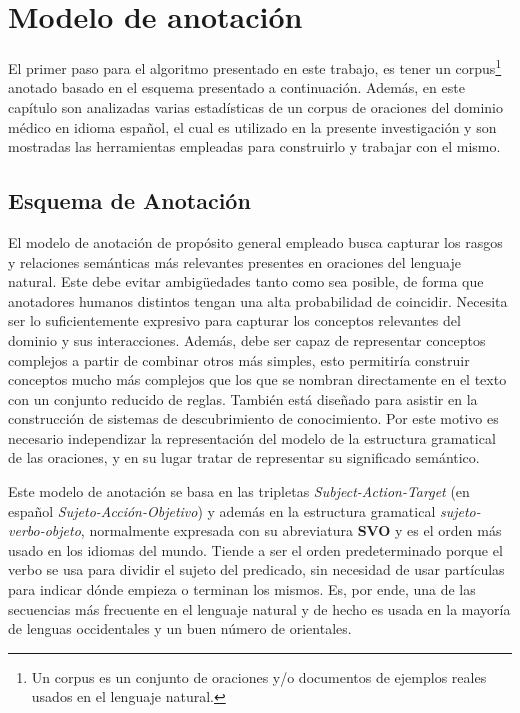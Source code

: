 \chapter{Modelo de anotación}\label{chapter:corpus-description}
El primer paso para el algoritmo presentado en este trabajo, es tener un corpus\footnote{Un corpus es un conjunto de oraciones y/o documentos de ejemplos reales usados en el lenguaje natural.} anotado basado en el esquema presentado a continuación. Además, en este capítulo son analizadas varias estadísticas de un corpus de oraciones del dominio médico en idioma español, el cual es utilizado en la presente investigación y son mostradas las herramientas empleadas para construirlo y trabajar con el mismo.


\section{Esquema de Anotación}
El modelo de anotación de propósito general empleado busca capturar los rasgos y relaciones semánticas más relevantes presentes en oraciones del lenguaje natural. Este debe evitar ambigüedades tanto como sea posible, de forma que anotadores humanos distintos tengan una alta probabilidad de coincidir. Necesita ser lo suficientemente expresivo para capturar los conceptos relevantes del dominio y sus interacciones. Además, debe ser capaz de representar conceptos complejos a partir de combinar otros más simples, esto permitiría construir conceptos mucho más complejos que los que se nombran directamente en el texto con un conjunto reducido de reglas. También está diseñado para asistir en la construcción de sistemas de descubrimiento de conocimiento. Por este motivo es necesario independizar la representación del modelo de la estructura gramatical de las oraciones, y en su lugar tratar de representar su significado semántico.

Este modelo de anotación se basa en las tripletas \textit{Subject-Action-Target} (en español \textit{Sujeto-Acción-Objetivo}) y además en la estructura gramatical \textit{sujeto-verbo-objeto}, normalmente expresada con su abreviatura \textbf{SVO} y es el orden más usado en los idiomas del mundo. Tiende a ser el orden predeterminado porque el verbo se usa para dividir el sujeto del predicado, sin necesidad de usar partículas para indicar dónde empieza o terminan los mismos. Es, por ende, una de las secuencias más frecuente en el lenguaje natural y de hecho es usada en la mayoría de lenguas occidentales y un buen número de orientales.


